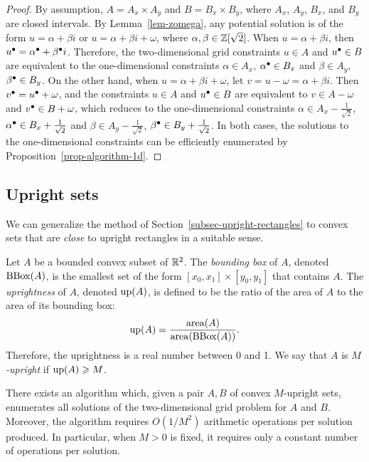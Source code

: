 \documentclass{article}
\begin{document}
\begin{proof}
  By assumption, $A=A_x\times A_y$ and $B=B_x\times B_y$, where $A_x$,
  $A_y$, $B_x$, and $B_y$ are closed intervals. By
  Lemma~\ref{lem-zomega}, any potential solution is of the form
  $u=\alpha+\beta i$ or $u=\alpha+\beta i+\omega$, where
  $\alpha,\beta\in\mathbb{Z}[\sqrt 2]$. When $u=\alpha+\beta i$, then $u^{\bullet} =
  \alpha^{\bullet} + \beta^{\bullet} i$. Therefore, the two-dimensional grid
  constraints $u\in A$ and $u^{\bullet}\in B$ are equivalent to the
  one-dimensional constraints $\alpha\in A_x$, $\alpha^{\bullet}\in B_x$ and
  $\beta\in A_y$, $\beta^{\bullet}\in B_y$.  On the other hand, when
  $u=\alpha+\beta i+\omega$, let $v = u-\omega = \alpha+\beta i$. Then
  $v^{\bullet} = u^{\bullet} + \omega$, and the constraints $u\in A$ and $u^{\bullet}\in
  B$ are equivalent to $v\in A-\omega$ and $v^{\bullet} \in B+\omega$, which
  reduces to the one-dimensional constraints $\alpha\in
  A_x-\frac{1}{\sqrt2}$, $\alpha^{\bullet}\in B_x+\frac{1}{\sqrt2}$ and
  $\beta\in A_y-\frac{1}{\sqrt2}$, $\beta^{\bullet}\in
  B_y+\frac{1}{\sqrt2}$.  In both cases, the solutions to the
  one-dimensional constraints can be efficiently enumerated by
  Proposition~\ref{prop-algorithm-1d}.
\end{proof}

\subsection{Upright sets}\label{ssec-uprightness}

We can generalize the method of
Section~\ref{subsec-upright-rectangles} to convex sets that are {\em
  close} to upright rectangles in a suitable sense.

\begin{definition}\label{def-uprightness}
  Let $A$ be a bounded convex subset of ${\mathbb{R}}^2$. The {\em bounding box}
  of $A$, denoted $\mathop{{\rm BBox}}\nolimits(A)$, is the smallest set of the form
  $[x_0,x_1]\times [y_0,y_1]$ that contains $A$. The {\em uprightness}
  of $A$, denoted $\mathop{\rm up}\nolimits(A)$, is defined to be the ratio of the area of
  $A$ to the area of its bounding box:
  \begin{equation}
    \mathop{\rm up}\nolimits(A) = \frac{\mathop{\rm area}\nolimits(A)}{\mathop{\rm area}\nolimits(\mathop{{\rm BBox}}\nolimits(A))}.
  \end{equation}
  Therefore, the uprightness is a real number between 0 and 1. We say
  that $A$ is {\em $M$-upright} if $\mathop{\rm up}\nolimits(A)\geqslant M$.
\end{definition}

\begin{lemma}\label{lem-upright-set}
  There exists an algorithm which, given a pair $A,B$ of convex
  $M$-upright sets, enumerates all solutions of the two-dimensional
  grid problem for $A$ and $B$. Moreover, the algorithm requires
  $O(1/M^2)$ arithmetic operations per solution produced. In
  particular, when $M>0$ is fixed, it requires only a constant number
  of operations per solution.
\end{lemma}
\end{document}
